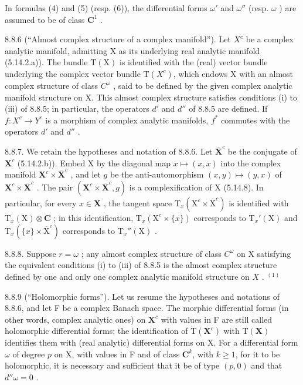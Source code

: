 In formulas (4) and (5) (resp. (6)), the differential forms \(\omega'\) and \(\omega''\) (resp. \(\omega\) ) are assumed to be of class \(\mathbf{C}^1\) .

8.8.6 (“Almost complex structure of a complex manifold”). Let \(X^c\) be a complex analytic manifold, admitting X as its underlying real analytic manifold (5.14.2.a)). The bundle \(\mathrm{T}(\mathrm{X})\) is identified with the (real) vector bundle underlying the complex vector bundle \(\mathrm{T}(X^c)\), which endows X with an almost complex structure of class \(C^\omega\) , said to be defined by the given complex analytic manifold structure on X. This almost complex structure satisfies conditions (i) to (iii) of 8.8.5; in particular, the operators \(d'\) and \(d''\) of 8.8.5 are defined. If \(f: X^c \to Y^c\) is a morphism of complex analytic manifolds, \(f^*\) commutes with the operators \(d'\) and \(d''\) .

8.8.7. We retain the hypotheses and notation of 8.8.6. Let \(\overline{\mathbf{X}}^c\) be the conjugate of \(\mathbf{X}^c\) (5.14.2.b)). Embed X by the diagonal map \(x \mapsto (x, x)\) into the complex manifold \(\mathbf{X}^c \times \overline{\mathbf{X}}^c\) , and let \(g\) be the anti-automorphism \((x, y) \mapsto (y, x)\) of \(\mathbf{X}^c \times \overline{\mathbf{X}}^c\) . The pair \((\mathbf{X}^c \times \overline{\mathbf{X}}^c, g)\) is a complexification of X (5.14.8). In particular, for every \(x \in \mathbf{X}\) , the tangent space \(\mathrm{T}_x(\mathrm{X}^c \times \overline{\mathrm{X}}^c)\) is identified with \(\mathrm{T}_x(\mathrm{X}) \otimes \mathbf{C}\) ; in this identification, \(\mathrm{T}_x(\mathrm{X}^c \times \{x\})\) corresponds to \(\mathrm{T}_x'(\mathrm{X})\) and \(\mathrm{T}_x(\{x\} \times \overline{\mathrm{X}}^c)\) corresponds to \(\mathrm{T}_x''(\mathrm{X})\) .

8.8.8. Suppose \(r = \omega\) ; any almost complex structure of class \(C^\omega\) on X satisfying the equivalent conditions (i) to (iii) of 8.8.5 is the almost complex structure defined by one and only one complex analytic manifold structure on \(X\) . \(^{(1)}\)

8.8.9 (“Holomorphic forms”). Let us resume the hypotheses and notations of 8.8.6, and let F be a complex Banach space. The morphic differential forms (in other words, complex analytic ones) on \(\mathbf{X}^c\) with values in F are still called holomorphic differential forms; the identification of \(\mathrm{T}(\mathbf{X}^c)\) with \(\mathrm{T}(\mathbf{X})\) identifies them with (real analytic) differential forms on X. For a differential form \(\omega\) of degree \(p\) on X, with values in F and of class \(\mathbf{C}^k\), with \(k \geqslant 1\), for it to be holomorphic, it is necessary and sufficient that it be of type \((p, 0)\) and that \(d''\omega = 0\) .

